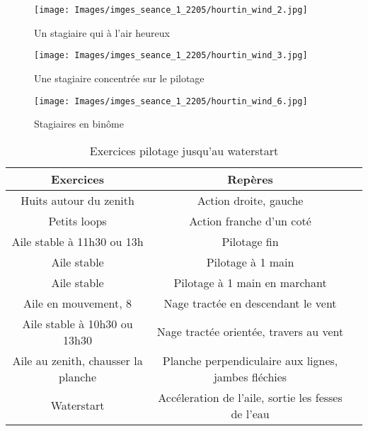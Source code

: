 \documentclass[11pt,a4paper]{report}
\begin{document}
\begin{figure}
\begin{minipage}{0.4\textwidth}
\texttt{[image: Images/imges\_seance\_1\_2205/hourtin\_wind\_2.jpg]} 
\caption{Un stagiaire qui à l'air heureux}
\end{minipage}
\hfill
\begin{minipage}{0.4\textwidth}
\texttt{[image: Images/imges\_seance\_1\_2205/hourtin\_wind\_3.jpg]} 
\caption{Une stagiaire concentrée sur le pilotage}
\end{minipage}
\end{figure}

\begin{figure}
\texttt{[image: Images/imges\_seance\_1\_2205/hourtin\_wind\_6.jpg]}
\caption{Stagiaires en bin\^ome} 
\end{figure}

\begin{table}
\begin{tabular}{|c|c|c|}
\hline
\textbf{Exercices}     &  \textbf{Repères}      \\
\hline 
Huits autour du zenith & Action droite, gauche   \\
\hline
Petits loops  & Action franche d'un coté  \\
\hline 
Aile stable à 11h30 ou 13h & Pilotage fin \\
\hline
Aile stable               & Pilotage à 1 main \\
\hline 
Aile stable               & Pilotage à 1 main en marchant \\
\hline
Aile en mouvement, 8      & Nage tractée en descendant le vent \\
\hline 
Aile stable à 10h30 ou 13h30   	& Nage tractée orientée, travers au vent \\
\hline
Aile au zenith, chausser la planche  & Planche perpendiculaire aux lignes, jambes fléchies \\
\hline
Waterstart                           &  Accéleration de l'aile, sortie les fesses de l'eau \\
\hline
\end{tabular}
\caption{Exercices pilotage jusqu'au waterstart\label{seance_pilotage}}
\end{table}
\end{document}
